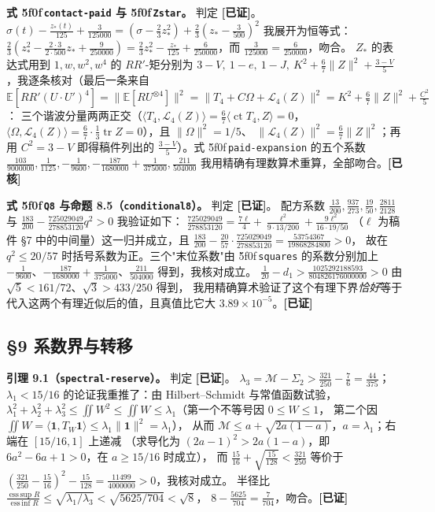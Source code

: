 \documentclass[UTF8,11pt]{ctexart}
\theoremstyle{definition}
\newcommand{\tr}{\operatorname{tr}}
\newcommand{\E}{\mathbb{E}}
\newcommand{\esssup}{\operatorname*{ess\,sup}}
\newcommand{\essinf}{\operatorname*{ess\,inf}}
\newcommand{\peq}[1]{\textup{\u5f0f}\,\texttt{#1}}
\newcommand{\ok}{\textcolor[rgb]{0.05,0.45,0.15}{\bfseries [已证]}}
\newcommand{\chk}{\textcolor[rgb]{0.05,0.25,0.55}{\bfseries [已核]}}
\begin{document}
\textbf{式 \peq{contact-paid} 与 \peq{Zstar}。} 判定 \ok。
$\sigma(t)-\frac{z_*(t)}{125}+\frac3{125000}=(\sigma-\frac23z_*^2)+\frac23(z_*-\frac3{500})^2$
我展开为恒等式：$\frac23(z_*^2-\frac{2\cdot3}{2\cdot500}z_*+\frac9{250000})
=\frac23z_*^2-\frac{z_*}{125}+\frac{6}{250000}$，而 $\frac3{125000}=\frac6{250000}$，吻合。
$Z_*$ 的表达式用到 $1,w,w^2,w^4$ 的 $RR'$-矩分别为
$3-V,\ 1-e,\ 1-J,\ K^2+\frac67\|Z\|^2+\frac{3-V}5$，我逐条核对（最后一条来自
$\E[RR'(U\cdot U')^4]=\|\E[RU^{\otimes4}]\|^2
=\|T_4+C\Omega+\mathcal L_4(Z)\|^2=K^2+\frac67\|Z\|^2+\frac{C^2}5$：
三个谐波分量两两正交（$\langle T_4,\mathcal L_4(Z)\rangle=\frac67\langle\operatorname{ct}T_4,Z\rangle=0$，
$\langle\Omega,\mathcal L_4(Z)\rangle=\frac67\cdot\frac13\tr Z=0$），且 $\|\Omega\|^2=1/5$、
$\|\mathcal L_4(Z)\|^2=\frac67\|Z\|^2$；再用 $C^2=3-V$ 即得稿件列出的 $\frac{3-V}5$）。式 \peq{paid-expansion} 的五个系数
$\frac{103}{9000000},\frac1{1125},-\frac1{9600},-\frac{187}{1680000}+\frac1{375000},\frac{211}{504000}$
我用精确有理数算术重算，全部吻合。\hfill\chk

\textbf{式 \peq{Q8} 与命题 8.5（\texttt{conditional8}）。} 判定 \ok。
配方系数 $\frac{13}{200},\frac{937}{273},\frac{19}{50},\frac{2811}{2128}$ 与
$\frac{183}{200}-\frac{725029049}{278853120}q^2>0$ 我验证如下：
$\frac{725029049}{278853120}=\frac{7\ell}4+\frac{\ell^2}{9\cdot13/200}+\frac{9\ell^2}{16\cdot19/50}$
（$\ell$ 为稿件 \S7 中的中间量）这一归并成立，且
$\frac{183}{200}-\frac{20}{57}\cdot\frac{725029049}{278853120}=\frac{53754367}{19868284800}>0$，
故在 $q^2\le20/57$ 时括号系数为正。三个"末位系数"由 \peq{squares} 的系数分别加上
$-\frac1{9600}$、$-\frac{187}{1680000}+\frac1{375000}$、$\frac{211}{504000}$ 得到，我核对成立。
$\frac1{20}-d_1>\frac{1025292188593}{804826176000000}>0$ 由 $\sqrt5<161/72$、$\sqrt3>433/250$ 得到，
我用精确算术验证了这个有理下界\emph{恰好}等于代入这两个有理近似后的值，且真值比它大
$3.89\times10^{-5}$。\hfill\ok

\subsection{\S9 系数界与转移}

\textbf{引理 9.1（\texttt{spectral-reserve}）。} 判定 \ok。
$\lambda_3=\mathcal M-\Sigma_2>\frac{321}{250}-\frac76=\frac{44}{375}$；
$\lambda_1<15/16$ 的论证我重推了：由 Hilbert--Schmidt 与常值函数试验，
$\lambda_1^2+\lambda_2^2+\lambda_3^2\le\iint W^2\le\iint W\le\lambda_1$（第一个不等号因 $0\le W\le1$，
第二个因 $\iint W=\langle\mathbf1,T_W\mathbf1\rangle\le\lambda_1\|\mathbf1\|^2=\lambda_1$），
从而 $\mathcal M\le a+\sqrt{2a(1-a)}$，$a=\lambda_1$；右端在 $[15/16,1]$ 上递减
（求导化为 $(2a-1)^2>2a(1-a)$，即 $6a^2-6a+1>0$，在 $a\ge15/16$ 时成立），
而 $\frac{15}{16}+\sqrt{\frac{15}{128}}<\frac{321}{250}$ 等价于
$(\frac{321}{250}-\frac{15}{16})^2-\frac{15}{128}=\frac{11499}{4000000}>0$，我核对成立。
半径比 $\frac{\esssup R}{\essinf R}\le\sqrt{\lambda_1/\lambda_3}<\sqrt{5625/704}<\sqrt8$，
$8-\frac{5625}{704}=\frac7{704}$，吻合。\hfill\ok
\end{document}
